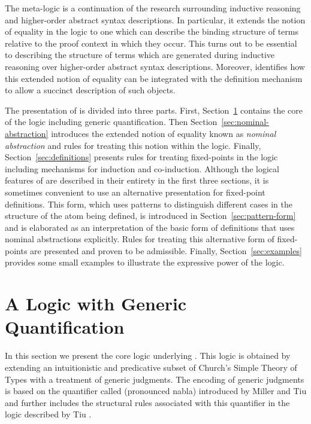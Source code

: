 The meta-logic \logic is a continuation of the research surrounding
inductive reasoning and higher-order abstract syntax descriptions. In
particular, it extends the notion of equality in the logic to one
which can describe the binding structure of terms relative to the
proof context in which they occur. This turns out to be essential to
describing the structure of terms which are generated during inductive
reasoning over higher-order abstract syntax descriptions. Moreover,
\logic identifies how this extended notion of equality can be
integrated with the definition mechanism to allow a succinct
description of such objects.

The presentation of \logic is divided into three parts. First,
Section~\ref{sec:logic} contains the core of the logic including
generic quantification. Then Section~\ref{sec:nominal-abstraction}
introduces the extended notion of equality known as {\em nominal
  abstraction} and rules for treating this notion within the logic.
Finally, Section~\ref{sec:definitions} presents rules for treating
fixed-points in the logic including mechanisms for induction and
co-induction. Although the logical features of \logic are described in
their entirety in the first three sections, it is sometimes convenient
to use an alternative presentation for fixed-point definitions. This
form, which uses patterns to distinguish different cases in the
structure of the atom being defined, is introduced in
Section~\ref{sec:pattern-form} and is elaborated as an interpretation
of the basic form of definitions that uses nominal abstractions
explicitly. Rules for treating this alternative form of fixed-points
are presented and proven to be admissible. Finally,
Section~\ref{sec:examples} provides some small examples to illustrate
the expressive power of the logic.

\section{A Logic with Generic Quantification}
\label{sec:logic}

In this section we present the core logic underlying \logic. This
logic is obtained by extending an intuitionistic and predicative
subset of Church's Simple Theory of Types with a treatment of generic
judgments. The encoding of generic judgments is based on the
quantifier called  (pronounced nabla) introduced by Miller and
Tiu \cite{miller05tocl} and further includes the structural rules
associated with this quantifier in the logic \LG described by Tiu
\cite{tiu06lfmtp}.


